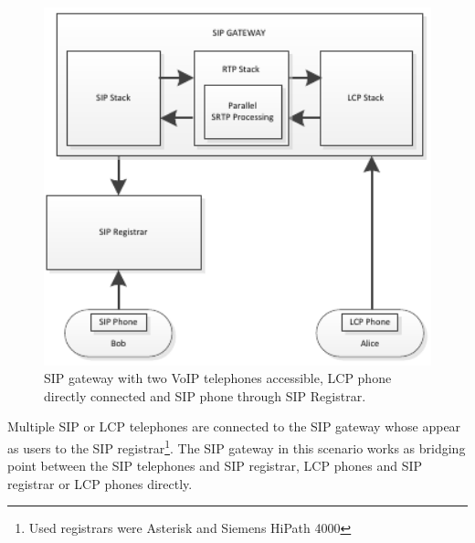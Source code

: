 \begin{figure}[h!]
\centering
\includegraphics[width=13cm]{fig/scenario1.pdf}
\caption[Gateway scenario]{SIP gateway with two VoIP telephones accessible, LCP 
phone directly connected and SIP phone through SIP Registrar.}
\label{oclpm}
\end{figure}

Multiple SIP or LCP telephones are connected to the SIP gateway whose appear as
users to the SIP registrar\footnote{ Used registrars were Asterisk and Siemens 
HiPath 4000}. The SIP gateway in this scenario works as bridging point between 
the SIP telephones and SIP registrar, LCP phones and SIP registrar or LCP phones
directly.

